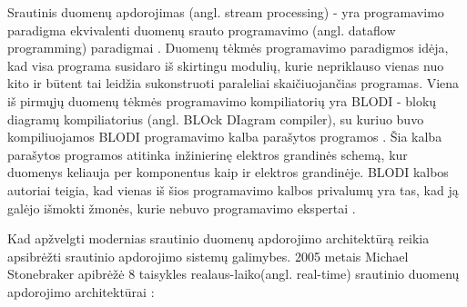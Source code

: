 \documentclass{VUMIFPSkursinis}
\begin{document}
    Srautinis duomenų apdorojimas (angl. stream processing) - yra programavimo paradigma ekvivalenti duomenų srauto programavimo (angl. dataflow programming) paradigmai \cite{shortstreamproc}. 
Duomenų tėkmės programavimo paradigmos idėja, kad visa programa susidaro iš skirtingu modulių, kurie nepriklauso vienas nuo kito ir būtent tai leidžia sukonstruoti paraleliai skaičiuojančias programas. 
Viena iš pirmųjų duomenų tėkmės programavimo kompiliatorių yra BLODI - blokų diagramų kompiliatorius (angl. BLOck DIagram compiler), su kuriuo buvo kompiliuojamos 
BLODI programavimo kalba parašytos programos \cite{kelly1961block}.  Šia kalba parašytos programos atitinka inžinierinę elektros grandinės schemą, 
kur duomenys keliauja per komponentus kaip ir elektros grandinėje. BLODI kalbos autoriai teigia, kad vienas iš šios programavimo kalbos privalumų yra tas, 
kad ją galėjo išmokti žmonės, kurie nebuvo programavimo ekspertai .\par
Kad apžvelgti modernias srautinio duomenų apdorojimo architektūrą reikia apsibrėžti srautinio apdorojimo sistemų galimybes.
2005 metais Michael Stonebraker apibrėžė 8 taisykles realaus-laiko(angl. real-time) srautinio duomenų apdorojimo architektūrai \cite{stonebraker20058}:
\end{document}
